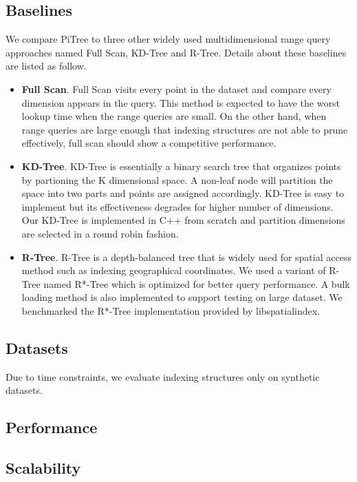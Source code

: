 \documentclass[sigconf,10pt]{acmart}
\begin{document}
\subsection{Baselines}

We compare PiTree to three other widely used multidimensional range query approaches 
named Full Scan, KD-Tree and R-Tree. Details about these baselines are listed 
as follow. 
\begin{itemize}
    \item \textbf{Full Scan}. Full Scan visits every point in the dataset and 
    compare every dimension appears in the query. This method is expected to have 
    the worst lookup time when the range queries are small. On the other hand, 
    when range queries are large enough that indexing structures are not able to 
    prune effectively, full scan should show a competitive performance.
    \item \textbf{KD-Tree}. KD-Tree is essentially a binary search tree that organizes
    points by partioning the K dimensional space. A non-leaf node will partition 
    the space into two parts and points are assigned accordingly. KD-Tree is easy to 
    implement but its effectiveness degrades for higher number of dimensions. Our KD-Tree is
    implemented in C++ from scratch and partition dimensions are selected in a round robin fashion.
    \item \textbf{R-Tree}. R-Tree is a depth-balanced tree that is widely used for spatial
    access method such as indexing geographical coordinates. We used a variant of R-Tree named
    R*-Tree which is optimized for better query performance. A bulk loading method is also 
    implemented to support testing on large dataset. We benchmarked the R*-Tree implementation
    provided by libspatialindex.\cite{libSpatialIndex}

\end{itemize}

\subsection{Datasets}

Due to time constraints, we evaluate indexing structures only on synthetic datasets.

\subsection{Performance}

\subsection{Scalability}
\end{document}

